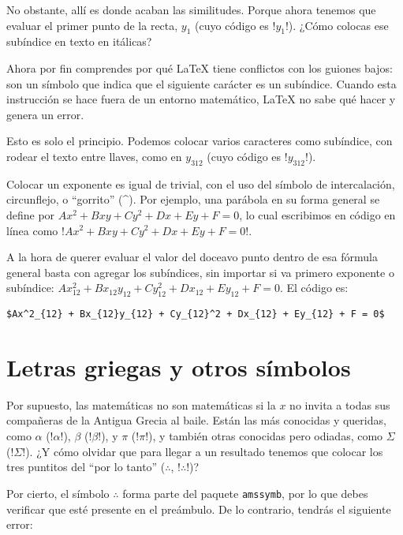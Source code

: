 No obstante, allí es donde acaban las similitudes. Porque ahora tenemos que evaluar el primer punto de la recta, $y_1$ (cuyo código es !$y_1$!). ¿Cómo colocas ese subíndice en texto en itálicas?

Ahora por fin comprendes por qué \LaTeX{} tiene conflictos con los guiones bajos: son un símbolo que indica que el siguiente carácter es un subíndice. Cuando esta instrucción se hace fuera de un entorno matemático, \LaTeX{} no sabe qué hacer y genera un error.

Esto es solo el principio. Podemos colocar varios caracteres como subíndice, con rodear el texto entre llaves, como en $y_{312}$ (cuyo código es !$y_{312}$!).

Colocar un exponente es igual de trivial, con el uso del símbolo de intercalación, circunflejo, o ``gorrito'' (\^{}). Por ejemplo, una parábola en su forma general se define por $Ax^2 + Bxy + Cy^2 + Dx + Ey + F = 0$, lo cual escribimos en código en línea como !$Ax^2 + Bxy + Cy^2 + Dx + Ey + F = 0$!.

A la hora de querer evaluar el valor del doceavo punto dentro de esa fórmula general basta con agregar los subíndices, sin importar si va primero exponente o subíndice: $Ax^2_{12} + Bx_{12}y_{12} + Cy_{12}^2 + Dx_{12} + Ey_{12} + F = 0$. El código es:

\begin{lstlisting}[style=latex,mathescape=false]
$Ax^2_{12} + Bx_{12}y_{12} + Cy_{12}^2 + Dx_{12} + Ey_{12} + F = 0$
\end{lstlisting}



\section{Letras griegas y otros símbolos}
\label{sec:letras_griegas_y_otros_simbolos}



Por supuesto, las matemáticas no son matemáticas si la $x$ no invita a todas sus compañeras de la Antigua Grecia al baile. Están las más conocidas y queridas, como $\alpha$ (!$\alpha$!), $\beta$ (!$\beta$!), y $\pi$ (!$\pi$!), y también otras conocidas pero odiadas, como $\Sigma$ (!$\Sigma$!). ¿Y cómo olvidar que para llegar a un resultado tenemos que colocar los tres puntitos del ``por lo tanto'' ($\therefore$, !$\therefore$!)?

Por cierto, el símbolo $\therefore$ forma parte del paquete \texttt{amssymb}, por lo que debes verificar que esté presente en el preámbulo. De lo contrario, tendrás el siguiente error:

